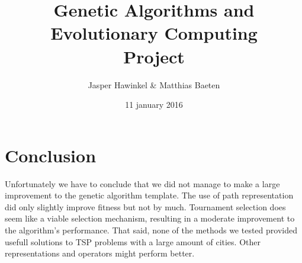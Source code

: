 


\title{Genetic Algorithms and Evolutionary Computing \\ Project}
\author{ Jasper Hawinkel \& Matthias Baeten }
\date{ 11 january 2016}





	\maketitle
	\tableofcontents
	
	
	
	
	\section{Conclusion}
	Unfortunately we have to conclude that we did not manage to make a large improvement to the genetic algorithm template. The use of path representation did only slightly improve fitness but not by much. Tournament selection does seem like a viable selection mechanism, resulting in a moderate improvement to the algorithm's performance. 
	That said, none of the methods we tested provided usefull solutions to TSP problems with a large amount of cities. Other representations and operators might perform better.
	
	
	\FloatBarrier
	
	
	

